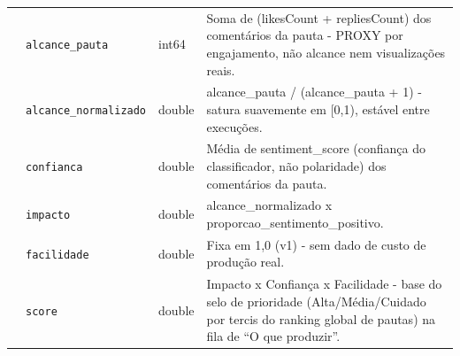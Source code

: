 \begin{footnotesize}
\begin{longtable}{p{3.2cm}p{3.0cm}p{2.0cm}p{6.0cm}}
\texttt{} & \texttt{alcance\_\allowbreak{}pauta} & int64 & Soma de (likesCount + repliesCount) dos comentários da pauta - PROXY por engajamento, não alcance nem visualizações reais. \\
\texttt{} & \texttt{alcance\_\allowbreak{}normalizado} & double & alcance\_\allowbreak{}pauta /\allowbreak{} (alcance\_\allowbreak{}pauta + 1) - satura suavemente em [0,1), estável entre execuções. \\
\texttt{} & \texttt{confianca} & double & Média de sentiment\_\allowbreak{}score (confiança do classificador, não polaridade) dos comentários da pauta. \\
\texttt{} & \texttt{impacto} & double & alcance\_\allowbreak{}normalizado x proporcao\_\allowbreak{}sentimento\_\allowbreak{}positivo. \\
\texttt{} & \texttt{facilidade} & double & Fixa em 1,0 (v1) - sem dado de custo de produção real. \\
\texttt{} & \texttt{score} & double & Impacto x Confiança x Facilidade - base do selo de prioridade (Alta/\allowbreak{}Média/\allowbreak{}Cuidado por tercis do ranking global de pautas) na fila de ``O que produzir''. \\
\end{longtable}
\end{footnotesize}
